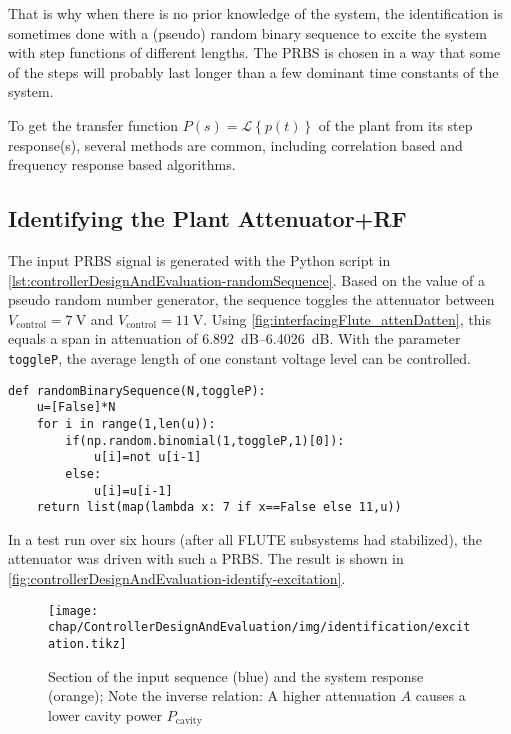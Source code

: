 That is why when there is no prior knowledge of the system, the identification is sometimes done with a (pseudo) random binary sequence to excite the system with step functions of different lengths. The PRBS is chosen in a way that some of the steps will probably last longer than a few dominant time constants of the system. 

To get the transfer function $P(s)=\mathcal{L}\left\{p(t)\right\}$ of the plant from its step response(s), several methods are common, including correlation based and frequency response based algorithms.

\subsection{Identifying the Plant Attenuator+RF}
The input PRBS signal is generated with the Python script in \autoref{lst:controllerDesignAndEvaluation-randomSequence}.
Based on the value of a pseudo random number generator, the sequence toggles the attenuator between $V_\text{control}=\SI{7}{\volt}$ and $V_\text{control}=\SI{11}{\volt}$.
Using \autoref{fig:interfacingFlute_attenDatten}, this equals a span in attenuation of \SIrange{6.892}{6.4026}{\dB}.
With the parameter \texttt{toggleP}, the average length of one constant voltage level can be controlled. 

\begin{lstlisting}[style=python,caption = Function to get a pseudo random binary sequence, label = lst:controllerDesignAndEvaluation-randomSequence]
def randomBinarySequence(N,toggleP):
    u=[False]*N
    for i in range(1,len(u)):
        if(np.random.binomial(1,toggleP,1)[0]):
            u[i]=not u[i-1]
        else:
            u[i]=u[i-1]
    return list(map(lambda x: 7 if x==False else 11,u))
\end{lstlisting}

In a test run over six hours (after all FLUTE subsystems had stabilized), the attenuator was driven with such a PRBS. The result is shown in \autoref{fig:controllerDesignAndEvaluation-identify-excitation}.

\begin{figure}[tb]
	\centering
	\texttt{[image: chap/ControllerDesignAndEvaluation/img/identification/excitation.tikz]}
	\caption{Section of the input sequence (blue) and the system response (orange); Note the inverse relation: A higher attenuation $A$ causes a lower cavity power $P_\text{cavity}$}
	\label{fig:controllerDesignAndEvaluation-identify-excitation}
\end{figure}

